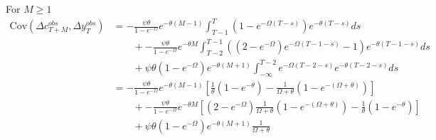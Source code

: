 \documentclass[12pt,pdftex,letterpaper]{article}
\begin{document}
For $M \geq 1$
\begin{align*}
\mathrm{Cov}(\Delta c_{T+M}^{obs},\Delta y_{T}^{obs}) 
&=-\frac{\psi \theta}{1-e^{-\Omega}} e^{-\theta (M-1)} \int_{T-1}^{T}  ( 1 - e^{-\Omega (T-s)} ) e^{-\theta (T-s)}ds \\
& \qquad +  -\frac{\psi \theta}{1-e^{-\Omega}}  e^{-\theta M} \int_{T-2}^{T-1}\left( (2-e^{-\Omega}) e^{-\Omega (T-1-s)} -1  \right)e^{-\theta (T-1-s)}ds \\
& \qquad +  \psi \theta (1-e^{-\Omega}) e^{-\theta (M+1)} \int_{-\infty}^{T-2}  e^{-\Omega (T-2-s)} e^{-\theta (T-2-s)}ds \\
&=-\frac{\psi \theta}{1-e^{-\Omega}} e^{-\theta (M-1)} \left[ \frac{1}{\theta}(1-e^{-\theta}) - \frac{1}{\Omega + \theta}(1-e^{-(\Omega+\theta)})  \right]\\
& \qquad +  -\frac{\psi \theta}{1-e^{-\Omega}}  e^{-\theta M} \left[ (2-e^{-\Omega})\frac{1}{\Omega + \theta}(1-e^{-(\Omega+\theta)})  - \frac{1}{\theta}(1-e^{-\theta})\right] \\
& \qquad +  \psi \theta (1-e^{-\Omega}) e^{-\theta (M+1)}\frac{1}{\Omega + \theta}
\end{align*}
\end{document}
